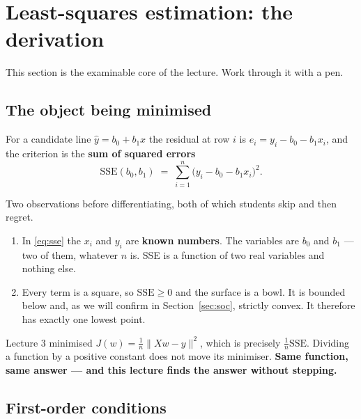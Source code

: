 \documentclass[11pt]{article}
\begin{document}
\section{Least-squares estimation: the derivation}
\label{sec:derive}

This section is the examinable core of the lecture. Work through it with a
pen.

\subsection{The object being minimised}

For a candidate line $\hat y = b_0 + b_1x$ the residual at row $i$ is
$e_i = y_i - b_0 - b_1x_i$, and the criterion is the \textbf{sum of squared
errors}
\begin{equation}
  \mathrm{SSE}(b_0, b_1) \;=\; \sum_{i=1}^{n}\bigl(y_i - b_0 - b_1x_i\bigr)^2 .
  \label{eq:sse}
\end{equation}

Two observations before differentiating, both of which students skip and then
regret.

\begin{enumerate}[leftmargin=*]
  \item In \eqref{eq:sse} the $x_i$ and $y_i$ are \textbf{known numbers}. The
    variables are $b_0$ and $b_1$ --- two of them, whatever $n$ is. SSE is a
    function of two real variables and nothing else.
  \item Every term is a square, so $\mathrm{SSE}\ge 0$ and the surface is a
    bowl. It is bounded below and, as we will confirm in
    Section~\ref{sec:soc}, strictly convex. It therefore has exactly one
    lowest point.
\end{enumerate}

\begin{keyidea}
Lecture 3 minimised $J(w) = \frac1n\lVert Xw - y\rVert^2$, which is precisely
$\frac1n\mathrm{SSE}$. Dividing a function by a positive constant does not
move its minimiser. \textbf{Same function, same answer --- and this lecture
finds the answer without stepping.}
\end{keyidea}

\subsection{First-order conditions}
\end{document}
